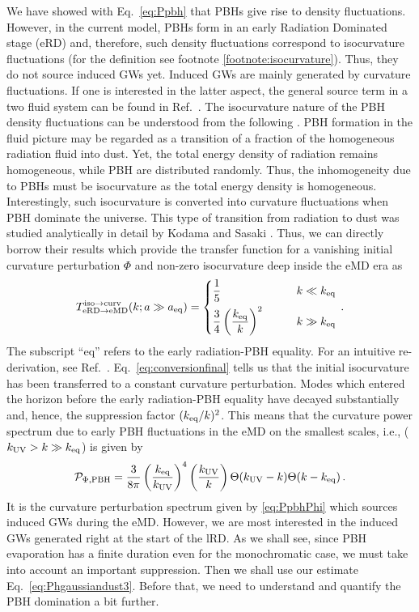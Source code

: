 \documentclass[a4paper,11pt]{article}
\numberwithin{equation}{section}
\begin{document}
We have showed with Eq.~\eqref{eq:Ppbh} that PBHs give rise to density fluctuations. However, in the current model, PBHs form in an early Radiation Dominated stage (eRD) and, therefore, such density fluctuations correspond to isocurvature fluctuations (for the definition see footnote \ref{footnote:isocurvature}). Thus, they do not source induced GWs yet. Induced GWs are mainly generated by curvature fluctuations. If one is interested in the latter aspect, the general source term in a two fluid system can be found in Ref.~\cite{Domenech:2020ssp}. The isocurvature nature of the PBH density fluctuations can be understood from the following \cite{Domenech:2020ssp}. PBH formation in the fluid picture may be regarded as a transition of a fraction of the homogeneous radiation fluid into dust. Yet, the total energy density of radiation remains homogeneous, while PBH are distributed randomly. Thus, the inhomogeneity due to PBHs must be isocurvature as the total energy density is homogeneous. Interestingly, such isocurvature is converted into curvature fluctuations when PBH dominate the universe. This type of transition from radiation to dust was studied analytically in detail by Kodama and Sasaki \cite{Kodama:1986fg,Kodama:1986ud}. Thus, we can directly borrow their results which provide the transfer function for a vanishing initial curvature perturbation $\Phi$ and non-zero isocurvature deep inside the eMD era as
\begin{align}\label{eq:conversionfinal}
T^{{\rm iso}\to{\rm curv}}_{{\rm eRD}\to{\rm eMD}}(k;a\gg a_{\rm eq})=\left\{
\begin{aligned}
&\frac{1}{5}\qquad  & k\ll k_{\rm eq}\\
&\frac{3}{4}\left(\frac{k_{\rm eq}}{k}\right)^2\qquad & k\gg k_{\rm eq}
\end{aligned}
\right.\,.
\end{align}
The subscript ``eq'' refers to the early radiation-PBH equality. For an intuitive re-derivation, see Ref.~\cite{Papanikolaou:2020qtd}. Eq.~\eqref{eq:conversionfinal} tells us that the initial isocurvature has been transferred to a constant curvature perturbation. Modes which entered the horizon before the early radiation-PBH equality have decayed substantially and, hence, the suppression factor $({k_{\rm eq}}/{k})^2$. This means that the curvature power spectrum due to early PBH fluctuations in the eMD on the smallest scales, i.e., ($k_{\rm UV}>k\gg k_{\rm eq}$) is given by
\begin{align}\label{eq:PpbhPhi}
{\cal P}_{\Phi,{\rm PBH}}=\frac{3}{8\pi}\left(\frac{k_{\rm eq}}{k_{\rm UV}}\right)^4\left(\frac{k_{\rm UV}}{k}\right)\Theta(k_{\rm UV}-k)\Theta(k-k_{\rm eq})\,.
\end{align}
It is the curvature perturbation spectrum given by \eqref{eq:PpbhPhi} which sources induced GWs during the eMD. However, we are most interested in the induced GWs generated right at the start of the lRD. As we shall see, since PBH evaporation has a finite duration even for the monochromatic case, we must take into account an important suppression. Then we shall use our estimate Eq.~\eqref{eq:Phgaussiandust3}. Before that, we need to understand and quantify the PBH domination a bit further.
\end{document}
